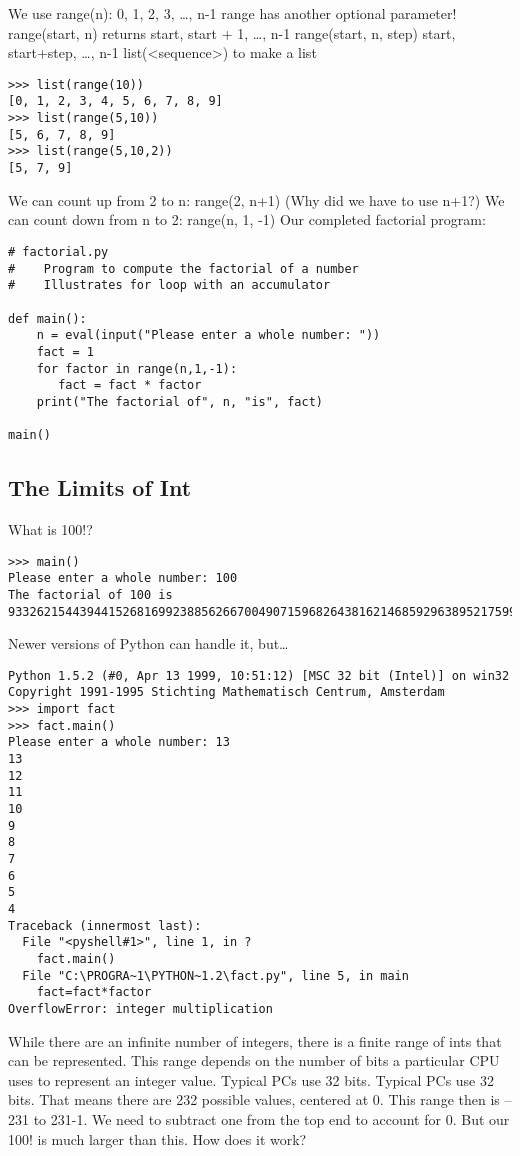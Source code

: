 \documentclass[12pt,a4paper,final,twoside,onecolumn,titlepage]{book}
\begin{document}
We use range(n):
0, 1, 2, 3, …, n-1
range has another optional parameter! range(start, n) returns
start, start + 1, …, n-1
range(start, n, step)
start, start+step, …, n-1
list(<sequence>) to make a list
\lstset{language=Python, tabsize=4}
\begin{lstlisting}
>>> list(range(10))
[0, 1, 2, 3, 4, 5, 6, 7, 8, 9]
>>> list(range(5,10))
[5, 6, 7, 8, 9]
>>> list(range(5,10,2))
[5, 7, 9]
\end{lstlisting}
We can count up from 2 to n:
range(2, n+1)
(Why did we have to use n+1?)
We can count down from n to 2:
range(n, 1, -1)
Our completed factorial program:
\lstset{language=Python, tabsize=4}
\begin{lstlisting}
# factorial.py
#    Program to compute the factorial of a number
#    Illustrates for loop with an accumulator

def main():
    n = eval(input("Please enter a whole number: "))
    fact = 1
    for factor in range(n,1,-1): 
       fact = fact * factor
    print("The factorial of", n, "is", fact)

main()
\end{lstlisting}
\subsection{The Limits of Int}
What is 100!?
\lstset{language=Python, tabsize=4}
\begin{lstlisting}
>>> main()
Please enter a whole number: 100
The factorial of 100 is 93326215443944152681699238856266700490715968264381621468592963895217599993229915608941463976156518286253697920827223758251185210916864000000000000000000000000
\end{lstlisting}
Newer versions of Python can handle it, but…
\lstset{language=Python, tabsize=4}
\begin{lstlisting}
Python 1.5.2 (#0, Apr 13 1999, 10:51:12) [MSC 32 bit (Intel)] on win32
Copyright 1991-1995 Stichting Mathematisch Centrum, Amsterdam
>>> import fact
>>> fact.main()
Please enter a whole number: 13
13
12
11
10
9
8
7
6
5
4
Traceback (innermost last):
  File "<pyshell#1>", line 1, in ?
    fact.main()
  File "C:\PROGRA~1\PYTHON~1.2\fact.py", line 5, in main
    fact=fact*factor
OverflowError: integer multiplication
\end{lstlisting}
While there are an infinite number of integers, there is a finite range of ints that can be represented. This range depends on the number of bits a particular CPU uses to represent an integer value. Typical PCs use 32 bits. Typical PCs use 32 bits. That means there are 232 possible values, centered at 0. This range then is –231 to 231-1. We need to subtract one from the top end to account for 0. But our 100! is much larger than this. How does it work?
\end{document}
